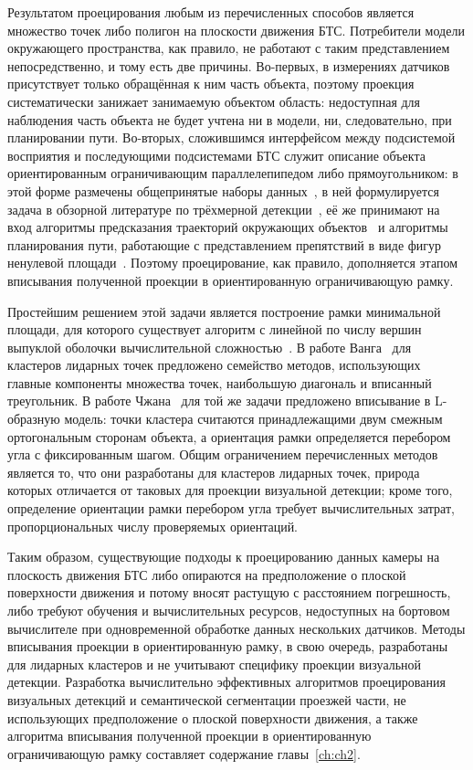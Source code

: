 Результатом проецирования любым из перечисленных способов является множество точек либо полигон на плоскости движения БТС. Потребители модели окружающего пространства, как правило, не работают с таким представлением непосредственно, и тому есть две причины. Во-первых, в измерениях датчиков присутствует только обращённая к ним часть объекта, поэтому проекция систематически занижает занимаемую объектом область: недоступная для наблюдения часть объекта не будет учтена ни в модели, ни, следовательно, при планировании пути. Во-вторых, сложившимся интерфейсом между подсистемой восприятия и последующими подсистемами БТС служит описание объекта ориентированным ограничивающим параллелепипедом либо прямоугольником: в этой форме размечены общепринятые наборы данных~\cite{caesar2020nuscenes}, в ней формулируется задача в обзорной литературе по трёхмерной детекции~\cite{mao20233d}, её же принимают на вход алгоритмы предсказания траекторий окружающих объектов~\cite{altche2017lstm} и алгоритмы планирования пути, работающие с представлением препятствий в виде фигур ненулевой площади~\cite{petrovskaya2008model}. Поэтому проецирование, как правило, дополняется этапом вписывания полученной проекции в ориентированную ограничивающую рамку.

Простейшим решением этой задачи является построение рамки минимальной площади, для которого существует алгоритм с линейной по числу вершин выпуклой оболочки вычислительной сложностью~\cite{arnon1983linear}. В работе Ванга~\cite{Wang2021} для кластеров лидарных точек предложено семейство методов, использующих главные компоненты множества точек, наибольшую диагональ и вписанный треугольник. В работе Чжана~\cite{zhang2017efficient} для той же задачи предложено вписывание в L-образную модель: точки кластера считаются принадлежащими двум смежным ортогональным сторонам объекта, а ориентация рамки определяется перебором угла с фиксированным шагом. Общим ограничением перечисленных методов является то, что они разработаны для кластеров лидарных точек, природа которых отличается от таковых для проекции визуальной детекции; кроме того, определение ориентации рамки перебором угла требует вычислительных затрат, пропорциональных числу проверяемых ориентаций.

Таким образом, существующие подходы к проецированию данных камеры на плоскость движения БТС либо опираются на предположение о плоской поверхности движения и потому вносят растущую с расстоянием погрешность, либо требуют обучения и вычислительных ресурсов, недоступных на бортовом вычислителе при одновременной обработке данных нескольких датчиков. Методы вписывания проекции в ориентированную рамку, в свою очередь, разработаны для лидарных кластеров и не учитывают специфику проекции визуальной детекции. Разработка вычислительно эффективных алгоритмов проецирования визуальных детекций и семантической сегментации проезжей части, не использующих предположение о плоской поверхности движения, а также алгоритма вписывания полученной проекции в ориентированную ограничивающую рамку составляет содержание главы~\cref{ch:ch2}.

